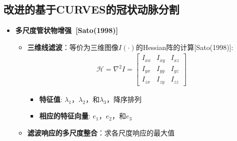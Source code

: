 \subsection[冠状动脉分割II]{改进的基于CURVES的冠状动脉分割}

\begin{frame}
\begin{itemize}
\item \textbf{多尺度管状物增强~[Sato(1998)]}
\begin{itemize}
\pause \item \textbf{三维线滤波}：等价为三维图像$I(\cdot)$的Hessian阵的计算[Sato(1998)]:
\begin{gather*}
\mathcal{H} = \nabla^2 I =
\begin{bmatrix}
I_{xx} & I_{xy} & I_{xz} \\ I_{yx} & I_{yy} & I_{yz} \\ I_{zx} & I_{zy} & I_{zz}
\end{bmatrix}
\end{gather*}
\begin{itemize}
\item \textbf{特征值}: $\lambda_1$，$\lambda_2$，和$\lambda_3$，降序排列
\item \textbf{相应的特征向量}: $e_1$，$e_2$，和$e_3$
\end{itemize}
\pause \item \textbf{滤波响应的多尺度整合}：求各尺度响应的最大值
\end{itemize}
\end{itemize}
\end{frame}

